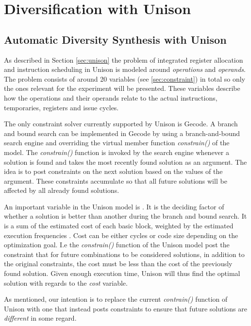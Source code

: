 \chapter{Diversification with Unison}

\section{Automatic Diversity Synthesis with Unison}
\label{sec:unison-model}


As described in Section \ref{sec:unison} the problem of integrated register allocation and
instruction scheduling in Unison is modeled around \textit{operations} and \textit{operands}.
The problem consists of around 20 variables (see \ref{sec:constraint}) in total so only the
ones relevant for the experiment will be presented. These variables describe how the
operations and their operands relate to the actual instructions, temporaries, registers
and issue cycles.

The only constraint solver currently supported by Unison is Gecode\cite{unison-docs}. A
branch and bound search can be implemented in Gecode by using a branch-and-bound search
engine and overriding the virtual member function \textit{constrain()} of the model. The
\textit{constrain()} function is invoked by the search engine whenever a solution is found
and takes the most recently found solution as an argument. The idea is to post constraints
on the next solution based on the values of the argument. These constraints accumulate so
that all future solutions will be affected by all already found solutions.

An important variable in the Unison model is . It is the deciding factor
of whether a solution is better than another during the branch and bound search. It is a
sum of the estimated cost of each basic block, weighted by the estimated execution
frequencies \cite{unison-docs}. Cost can be either cycles or code size depending on the
optimization goal. I.e the \textit{constrain()} function of the Unison model post the
constraint that for future combinations to be considered solutions, in addition to the
original constraints, the cost must be less than the cost of the previously found solution.
Given enough execution time, Unison will thus find the optimal solution with regards to
the \textit{cost} variable.

As mentioned, our intention is to replace the current \textit{contrain()} function of
Unison with one that instead posts constraints to ensure that future solutions are
\textit{different} in some regard.

